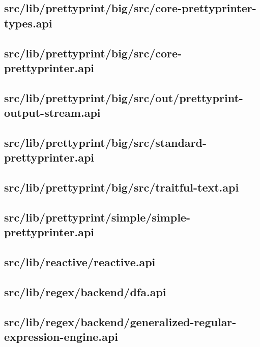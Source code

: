 \subsection{src/lib/prettyprint/big/src/core-prettyprinter-types.api}


\subsection{src/lib/prettyprint/big/src/core-prettyprinter.api}


\subsection{src/lib/prettyprint/big/src/out/prettyprint-output-stream.api}


\subsection{src/lib/prettyprint/big/src/standard-prettyprinter.api}


\subsection{src/lib/prettyprint/big/src/traitful-text.api}


\subsection{src/lib/prettyprint/simple/simple-prettyprinter.api}


\subsection{src/lib/reactive/reactive.api}


\subsection{src/lib/regex/backend/dfa.api}


\subsection{src/lib/regex/backend/generalized-regular-expression-engine.api}


